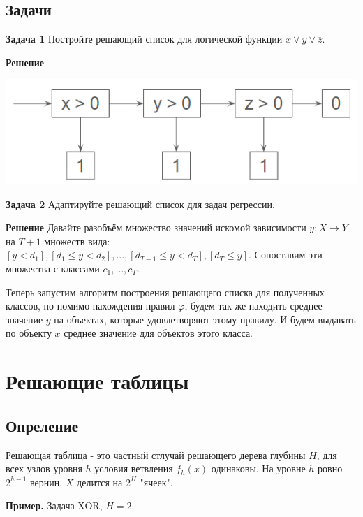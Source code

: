 \subsection{Задачи}

\textbf{Задача 1}
Постройте решающий список для логической функции $x \vee y \vee \overline{z}.$

\textbf{Решение}

\includegraphics[scale = 0.5]{chapters/logical/images/decide_list_task1_sol.png}

\textbf{Задача 2}
Адаптируйте решающий список для задач регрессии.

\textbf{Решение}
Давайте разобъём множество значений искомой зависимости $y: X \rightarrow{} Y$ на $T + 1$ множеств вида:
$[y < d_1], [d_1 \leq y < d_2], ..., [d_{T-1} \leq y < d_T], [d_T \leq y].$
Сопоставим эти множества с классами $c_1, \dots, c_T$.

Теперь запустим алгоритм построения решающего списка для полученных классов, 
но помимо нахождения правил $\varphi$, будем так же находить среднее значение $y$ на объектах, которые удовлетворяют этому правилу.
И будем выдавать по объекту $x$ среднее значение для объектов этого класса.

\section {Решающие таблицы}
\subsection{Опреление}

Решающая таблица - это частный стлучай решающего дерева глубины $H$, для всех узлов уровня $h$ условия ветвления $f_h(x)$ одинаковы. На уровне $h$ ровно $2^{h-1}$ вернин. $X$ делится на $2^H$ "ячеек".

\textbf{Пример.} Задача XOR, $H = 2$.

